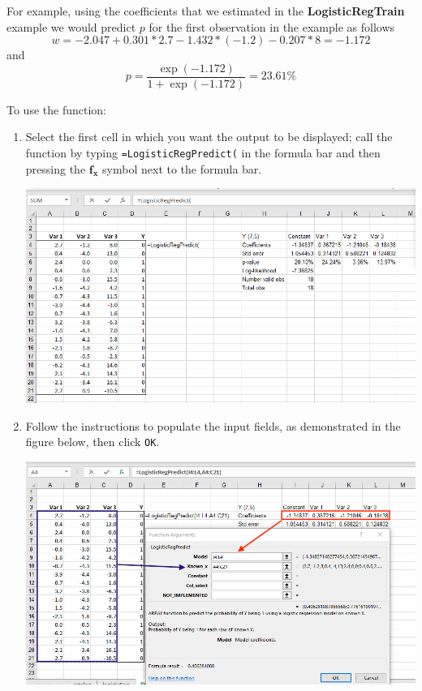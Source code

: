 \documentclass[12pt]{article}
\begin{document}
For example, using the coefficients that we estimated in the \textbf{LogisticRegTrain} example we would predict $p$  for the first observation in the example as follows
\[
w=-2.047+0.301 * 2.7- 1.432 * (-1.2) -0.207 * 8=-1.172
\]
and
\[
p=\frac{\exp(-1.172)}{1+\exp(-1.172)}=23.61\%
\]

To use the function:
\begin{enumerate}
\item Select the first cell in which you want the output to be displayed; call the function by typing \texttt{=LogisticRegPredict(} in the formula bar and then pressing the $\boldsymbol{f_x}$ symbol next to the formula bar.

\medskip

\centerline{\includegraphics[width=6in]{figures/LogRegPred1}}

\medskip

\item Follow the instructions to populate the input fields, as demonstrated in the figure below, then click \texttt{OK}.

\medskip

\centerline{\includegraphics[width=6in]{figures/LogRegPred2}}


\end{enumerate}
\end{document}
